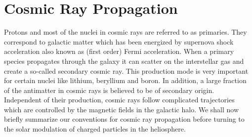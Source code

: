 \documentclass[a4paper,11pt]{article}
\begin{document}
\section{Cosmic Ray Propagation}
Protons and most of the nuclei in cosmic rays are referred to as primaries. They correspond to galactic matter which has been energized by supernova shock acceleration also known as (first order) Fermi acceleration. When a primary species propagates through the galaxy it can scatter on the interstellar gas and create a so-called secondary cosmic ray. This production mode is very important for certain nuclei like lithium, beryllium and boron. In addition, a large fraction of the antimatter in cosmic rays is believed to be of secondary origin. Independent of their production, cosmic rays follow complicated trajectories which are controlled by the magnetic fields in the galactic halo. We shall now briefly summarize our conventions for cosmic ray propagation before turning to the solar modulation of charged particles in the heliosphere. 
\end{document}
